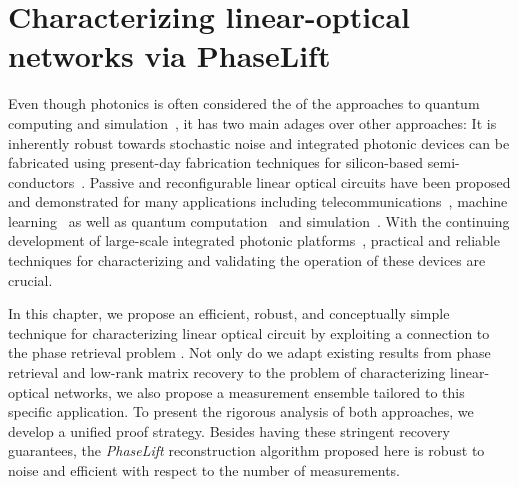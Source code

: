 \chapter{Characterizing linear-optical networks via PhaseLift}%
\label{chap:phaselift}


Even though photonics is often considered the  of the approaches to quantum computing and simulation~\cite{Rudolph_2016_Why}, it has two main adages over other approaches:
It is inherently robust towards stochastic noise and integrated photonic devices can be fabricated using present-day fabrication techniques for silicon-based semi-conductors~\cite{Rudolph_2016_Why}.
Passive and reconfigurable linear optical circuits have been proposed and demonstrated for many applications including telecommunications~\cite{Miller_2015_Sorting}, machine learning~\cite{Shen_2017_Deep} as well as quantum computation~\cite{Carolan_2015_Universal} and simulation~\cite{Harris_2017_Quantum}.
With the continuing development of large-scale integrated photonic platforms~\cite{Silverstone_2016_Silicon,Seok_2016_LargeScale}, practical and reliable techniques for characterizing and validating the operation of these devices are crucial.

In this chapter, we propose an efficient, robust, and conceptually simple technique for characterizing linear optical circuit by exploiting a connection to the phase retrieval problem \cite{Walther_1963_Question}.
Not only do we adapt existing results from phase retrieval and low-rank matrix recovery to the problem of characterizing linear-optical networks, we also propose a measurement ensemble tailored to this specific application.
To present the rigorous analysis of both approaches, we develop a unified proof strategy.
Besides having these stringent recovery guarantees, the \emph{PhaseLift} reconstruction algorithm proposed here is robust to noise and efficient with respect to the number of measurements.

